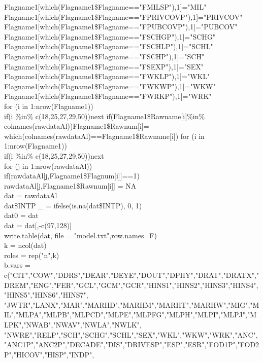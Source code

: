 \documentclass[12pt]{article}
\begin{document}
Flagname1[which(Flagname1\$Flagname=="FMILSP"),1]="MIL"\\
Flagname1[which(Flagname1\$Flagname=="FPRIVCOVP"),1]="PRIVCOV"\\
Flagname1[which(Flagname1\$Flagname=="FPUBCOVP"),1]="PUBCOV"\\
Flagname1[which(Flagname1\$Flagname=="FSCHGP"),1]="SCHG"\\
Flagname1[which(Flagname1\$Flagname=="FSCHLP"),1]="SCHL"\\
Flagname1[which(Flagname1\$Flagname=="FSCHP"),1]="SCH"\\
Flagname1[which(Flagname1\$Flagname=="FSEXP"),1]="SEX"\\
Flagname1[which(Flagname1\$Flagname=="FWKLP"),1]="WKL"\\
Flagname1[which(Flagname1\$Flagname=="FWKWP"),1]="WKW"\\
Flagname1[which(Flagname1\$Flagname=="FWRKP"),1]="WRK"\\
for (i in 1:nrow(Flagname1)) {\\
  if(i \%in\% c(18,25,27,29,50)){next}
  if(Flagname1\$Rawname[i]\%in\% colnames(rawdataAl)){Flagname1\$Rawnum[i]= which(colnames(rawdataAl)==Flagname1\$Rawname[i])}
}
for (i in 1:nrow(Flagname1)){\\
  if(i \%in\% c(18,25,27,29,50)){next}
\\  for (j in 1:nrow(rawdataAl)) {
  \\  if(rawdataAl[j,Flagname1\$Flagnum[i]]==1){
    \\  rawdataAl[j,Flagname1\$Rawnum[i]] = NA
    \\}
  }
}
dat = rawdataAl\\
dat\$INTP \_  = ifelse(is.na(dat\$INTP), 0, 1)\\
dat0 = dat\\
dat = dat[,-c(97,128)]\\
write.table(dat, file = "model.txt",row.names=F)\\
k = ncol(dat)\\
roles = rep("n",k)\\
b.vars =\\ c("CIT","COW","DDRS","DEAR","DEYE","DOUT","DPHY","DRAT","DRATX","DREM","ENG","FER","GCL","GCM","GCR","HINS1","HINS2","HINS3","HINS4","HINS5","HINS6","HINS7",
           "JWTR","LANX","MAR","MARHD","MARHM","MARHT","MARHW","MIG","MIL","MLPA","MLPB","MLPCD","MLPE","MLPFG","MLPH","MLPI","MLPJ","MLPK","NWAB","NWAV","NWLA","NWLK",
           "NWRE","RELP","SCH","SCHG","SCHL","SEX","WKL","WKW","WRK","ANC","ANC1P","ANC2P","DECADE","DIS","DRIVESP","ESP","ESR","FOD1P","FOD2P","HICOV","HISP","INDP",
\end{document}
